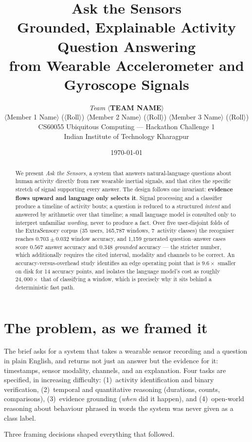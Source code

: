 \documentclass[11pt,a4paper]{article}
\title{\textbf{Ask the Sensors}\\[2pt]
\large Grounded, Explainable Activity Question Answering\\
\large from Wearable Accelerometer and Gyroscope Signals}
\author{%
  \textit{Team} \textbf{$\langle$TEAM NAME$\rangle$} \\[4pt]
  $\langle$Member 1 Name$\rangle$ ($\langle$Roll$\rangle$) \quad
  $\langle$Member 2 Name$\rangle$ ($\langle$Roll$\rangle$) \quad
  $\langle$Member 3 Name$\rangle$ ($\langle$Roll$\rangle$) \\[4pt]
  CS60055 Ubiquitous Computing --- Hackathon Challenge 1 \\
  Indian Institute of Technology Kharagpur%
}
\date{\today}
\begin{document}
\maketitle

\begin{abstract}
\noindent
We present \emph{Ask the Sensors}, a system that answers natural-language questions
about human activity directly from raw wearable inertial signals, and that cites the
specific stretch of signal supporting every answer. The design follows one invariant:
\textbf{evidence flows upward and language only selects it}. Signal processing and a
classifier produce a timeline of activity bouts; a question is reduced to a structured
\emph{intent} and answered by arithmetic over that timeline; a small language model is
consulted only to interpret unfamiliar \emph{wording}, never to produce a fact. Over
five user-disjoint folds of the ExtraSensory corpus (35 users, 165{,}787 windows,
7~activity classes) the recogniser reaches $0.703 \pm 0.032$ window accuracy, and
1{,}159 generated question--answer cases score $0.567$ answer accuracy and $0.348$
\emph{grounded} accuracy --- the stricter number, which additionally requires the cited
interval, modality and channels to be correct. An accuracy-versus-overhead study
identifies an edge operating point that is $9.6\times$ smaller on disk for 14 accuracy
points, and isolates the language model's cost as roughly $24{,}000\times$ that of
classifying a window, which is precisely why it sits behind a deterministic fast path.
\end{abstract}

\vspace{-0.5em}
\section{The problem, as we framed it}

The brief asks for a system that takes a wearable sensor recording and a question in
plain English, and returns not just an answer but the evidence for it: timestamps,
sensor modality, channels, and an explanation. Four tasks are specified, in increasing
difficulty: (1)~activity identification and binary verification, (2)~temporal and
quantitative reasoning (durations, counts, comparisons), (3)~evidence grounding
(\emph{when} did it happen), and (4)~open-world reasoning about behaviour phrased in
words the system was never given as a class label.

Three framing decisions shaped everything that followed.
\end{document}
